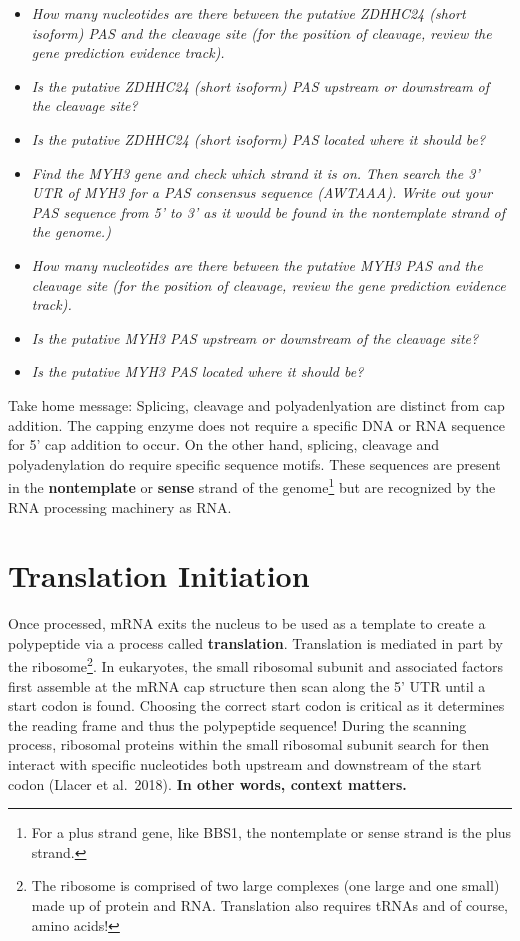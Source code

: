 \documentclass[
]{book}
\begin{document}
\begin{itemize}
\item
  \emph{How many nucleotides are there between the putative ZDHHC24 (short isoform) PAS and the cleavage site (for the position of cleavage, review the gene prediction evidence track).}
\item
  \emph{Is the putative ZDHHC24 (short isoform) PAS upstream or downstream of the cleavage site?}
\item
  \emph{Is the putative ZDHHC24 (short isoform) PAS located where it should be?}
\item
  \emph{Find the MYH3 gene and check which strand it is on. Then search the 3' UTR of MYH3 for a PAS consensus sequence (AWTAAA). Write out your PAS sequence from 5' to 3' as it would be found in the nontemplate strand of the genome.)}
\item
  \emph{How many nucleotides are there between the putative MYH3 PAS and the cleavage site (for the position of cleavage, review the gene prediction evidence track).}
\item
  \emph{Is the putative MYH3 PAS upstream or downstream of the cleavage site?}
\item
  \emph{Is the putative MYH3 PAS located where it should be?}
\end{itemize}

Take home message: Splicing, cleavage and polyadenlyation are distinct from cap addition. The capping enzyme does not require a specific DNA or RNA sequence for 5' cap addition to occur. On the other hand, splicing, cleavage and polyadenylation do require specific sequence motifs. These sequences are present in the \textbf{nontemplate} or \textbf{sense} strand of the genome\footnote{For a plus strand gene, like BBS1, the nontemplate or sense strand is the plus strand.} but are recognized by the RNA processing machinery as RNA.

\hypertarget{translation-initiation}{%
\section{Translation Initiation}\label{translation-initiation}}

Once processed, mRNA exits the nucleus to be used as a template to create a polypeptide via a process called \textbf{translation}. Translation is mediated in part by the ribosome\footnote{The ribosome is comprised of two large complexes (one large and one small) made up of protein and RNA. Translation also requires tRNAs and of course, amino acids!}. In eukaryotes, the small ribosomal subunit and associated factors first assemble at the mRNA cap structure then scan along the 5' UTR until a start codon is found. Choosing the correct start codon is critical as it determines the reading frame and thus the polypeptide sequence! During the scanning process, ribosomal proteins within the small ribosomal subunit search for then interact with specific nucleotides both upstream and downstream of the start codon (Llacer et al.~2018). \textbf{In other words, context matters.}
\end{document}
